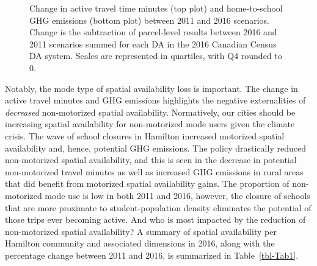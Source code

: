 \documentclass[
default
]{sn-jnl}
\begin{document}
\begin{figure}[H]


\caption{\label{fig-Fig7}Change in active travel time minutes (top plot)
and home-to-school GHG emissions (bottom plot) between 2011 and 2016
scenarios. Change is the subtraction of parcel-level results between
2016 and 2011 scenarios summed for each DA in the 2016 Canadian Census
DA system. Scales are represented in quartiles, with Q4 rounded to 0.}

\end{figure}%

Notably, the mode type of spatial availability loss is important. The
change in active travel minutes and GHG emissions highlights the
negative externalities of \emph{decreased} non-motorized spatial
availability. Normatively, our cities should be increasing spatial
availability for non-motorized mode users given the climate crisis. The
wave of school closures in Hamilton increased motorized spatial
availability and, hence, potential GHG emissions. The policy drastically
reduced non-motorized spatial availability, and this is seen in the
decrease in potential non-motorized travel minutes as well as increased
GHG emissions in rural areas that did benefit from motorized spatial
availability gains. The proportion of non-motorized mode use is low in
both 2011 and 2016, however, the closure of schools that are more
proximate to student-population density eliminates the potential of
those trips ever becoming active. And who is most impacted by the
reduction of non-motorized spatial availability? A summary of spatial
availability per Hamilton community and associated dimensions in 2016,
along with the percentage change between 2011 and 2016, is summarized in
Table~\ref{tbl-Tab1}.
\end{document}
